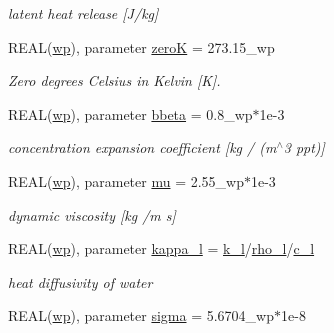 \begin{DoxyCompactItemize}
\begin{DoxyCompactList}\small\item\em latent heat release \mbox{[}J/kg\mbox{]} \item\end{DoxyCompactList}\item 
REAL(\hyperlink{namespacemo__parameters_a41be20bed1dcec244405328deaaffe30}{wp}), parameter \hyperlink{namespacemo__parameters_a4469df80801aa14e38268a452ce774a2}{zeroK} = 273.15\_\-wp
\begin{DoxyCompactList}\small\item\em Zero degrees Celsius in Kelvin \mbox{[}K\mbox{]}. \item\end{DoxyCompactList}\item 
REAL(\hyperlink{namespacemo__parameters_a41be20bed1dcec244405328deaaffe30}{wp}), parameter \hyperlink{namespacemo__parameters_acde561d09dcbc152555d452514b4a71b}{bbeta} = 0.8\_\-wp$\ast$1e-\/3
\begin{DoxyCompactList}\small\item\em concentration expansion coefficient \mbox{[}kg / (m$^\wedge$3 ppt)\mbox{]} \item\end{DoxyCompactList}\item 
REAL(\hyperlink{namespacemo__parameters_a41be20bed1dcec244405328deaaffe30}{wp}), parameter \hyperlink{namespacemo__parameters_a64a337227f714967ae941ebe24b935ce}{mu} = 2.55\_\-wp$\ast$1e-\/3
\begin{DoxyCompactList}\small\item\em dynamic viscosity \mbox{[}kg /m s\mbox{]} \item\end{DoxyCompactList}\item 
REAL(\hyperlink{namespacemo__parameters_a41be20bed1dcec244405328deaaffe30}{wp}), parameter \hyperlink{namespacemo__parameters_a5355c60cba43613d845739fba4c9e0af}{kappa\_\-l} = \hyperlink{namespacemo__parameters_aee1eca61b39f2038e51bfe41f1fbd574}{k\_\-l}/\hyperlink{namespacemo__parameters_a7c9d4f55d958561511f30542576af730}{rho\_\-l}/\hyperlink{namespacemo__parameters_a53f3c50306e6d9fb7928aacdd48d9776}{c\_\-l}
\begin{DoxyCompactList}\small\item\em heat diffusivity of water \item\end{DoxyCompactList}\item 
REAL(\hyperlink{namespacemo__parameters_a41be20bed1dcec244405328deaaffe30}{wp}), parameter \hyperlink{namespacemo__parameters_a84bbd94990a472b5855a98d709d0a8af}{sigma} = 5.6704\_\-wp$\ast$1e-\/8

\end{DoxyCompactItemize}
